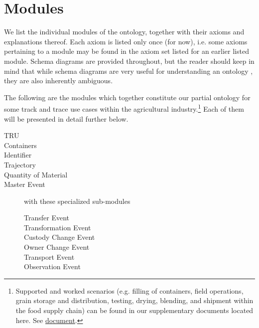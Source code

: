 \chapter{Modules}
\label{sec:mods}
We list the individual modules of the ontology, together with their axioms and explanations thereof. Each axiom is listed only once (for now), i.e. some axioms pertaining to a module may be found in the axiom set listed for an earlier listed module. Schema diagrams are provided throughout, but the reader should keep in mind that while schema diagrams are very useful for understanding an ontology \cite{odp-documentation,ShimizuEKHKH19}, they are also inherently ambiguous.

The following are the modules which together constitute our partial ontology for some track and trace use cases within the agricultural industry.\footnote{Supported and worked scenarios (e.g. filling of containers, field operations, grain storage and distribution, testing, drying, blending, and shipment within the food supply chain) can be found in our supplementary documents located here. See \url{document}.} Each of them will be presented in detail further below.
\begin{description}
    \item[TRU] 
    \item[Containers]
    \item[Identifier]
    \item[Trajectory]
    \item[Quantity of Material]
    \item[Master Event] with these specialized sub-modules
    \begin{description}
        \item[Transfer Event] 
        \item[Transformation Event] 
        \item[Custody Change Event] 
        \item[Owner Change Event] 
        \item[Transport Event] 
        \item[Observation Event] 
    \end{description}
\end{description}
